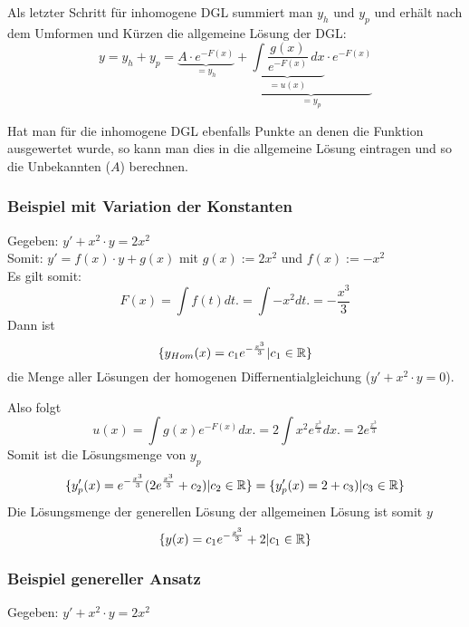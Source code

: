 Als letzter Schritt für inhomogene DGL summiert man $y_h$ und $y_p$ und erhält nach
dem Umformen und Kürzen die allgemeine Lösung der DGL:
{\small
\[
y = y_h + y_p = 
\underbrace{A \cdot e^{-F(x)}}_{= y_h} +
\underbrace{\underbrace{\int \frac{g(x)}{e^{-F(x)}}\,dx}_{= u(x)} \cdot e^{-F(x)}}_{= y_p}
\]
}

Hat man für die inhomogene DGL ebenfalls Punkte an denen die Funktion ausgewertet wurde,
so kann man dies in die allgemeine Lösung eintragen und so die Unbekannten ($A$) berechnen.

\subsubsection{Beispiel mit Variation der Konstanten}
Gegeben: $y' + x^2 \cdot y = 2x^2$\\
Somit:  $y' = f(x) \cdot y + g(x)$ mit $g(x) := 2x^2$ und $f(x) :=  - x^2$\\
Es gilt somit:\[
F(x) = \int f(t) dt. =  \int - x^2 dt. = -\frac{x^3}{3}
\]
Dann ist \[
\{y_{Hom}(x) = c_1e^{-\frac{x^3}{3}}| c_1 \in \mathbb{R}\}
\] die Menge aller Lösungen der homogenen Differnentialgleichung ($y' + x^2\cdot y = 0$). \\


Also folgt\[
u(x) = \int  g(x)e^{-F(x)} dx. =  2 \int  x^2e^{\frac{x^3}{3}} dx. = 2e^{\frac{x^3}{3}}
\]
Somit ist die Lösungsmenge von $y_p$
\[
\{ y_p'(x) = e^{-\frac{x^3}{3}} (2e^{\frac{x^3}{3}} + c_2) | c_2 \in \mathbb{R} \}
= \{ y_p'(x) =2 + c_3) | c_3 \in \mathbb{R} \}
\]
Die Lösungsmenge der generellen Lösung der allgemeinen Lösung ist somit $y$\[
\{ y(x) =  c_1e^{-\frac{x^3}{3}} +  2  | c_1 \in \mathbb{R} \}
\]

\subsubsection{Beispiel genereller Ansatz}
Gegeben: $y' + x^2 \cdot y = 2x^2$

